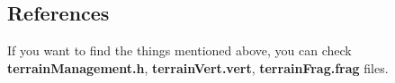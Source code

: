 \newpage

\begin{figure}[hbt!]
	\centering
	\qquad
	\caption{}
\end{figure}

\subsection{References}

If you want to find the things mentioned above, you can check \textbf{terrainManagement.h}, \textbf{terrainVert.vert}, \textbf{terrainFrag.frag} files.

\newpage